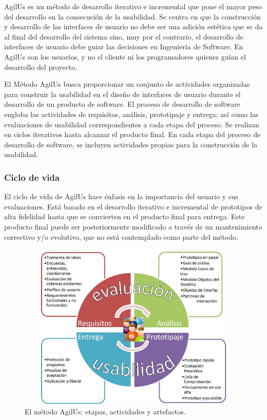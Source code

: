 	AgilUs es un método de desarrollo iterativo e incremental que pone el mayor peso del desarrollo en la consecución de la usabilidad. Se centra en que la construcción y desarrollo de las interfaces de usuario no debe ser una adición estética que se da al final del desarrollo del sistema sino, muy por el contrario, el desarrollo de interfaces de usuario debe guiar las decisiones en Ingeniería de Software. En AgilUs son los usuarios, y no el cliente ni los programadores quienes guían el desarrollo del proyecto.

	El Método AgilUs busca proporcionar un conjunto de actividades organizadas para construir la usabilidad en el diseño de interfaces de usuario durante el desarrollo de un producto de software. El proceso de desarrollo de software engloba las actividades de requisitos, análisis, prototipaje y entrega; así como las evaluaciones de usabilidad correspondientes a cada etapa del proceso. Se realizan en ciclos iterativos hasta alcanzar el producto final. En cada etapa del proceso de desarrollo de software, se incluyen actividades propias para la construcción de la usabilidad.

\setlength{\parskip}{0mm}

\subsubsection{Ciclo de vida}
\setlength{\parskip}{5mm}
	El ciclo de vida de AgilUs hace énfasis en la importancia del usuario y sus evaluaciones. Está basado en el desarrollo iterativo e incremental de prototipos de alta fidelidad hasta que se convierten en el producto final para entrega. Este producto final puede ser posteriormente modificado a través de un mantenimiento correctivo y/o evolutivo, que no está contemplado como parte del método.
	\setlength{\parskip}{0mm}
\newpage
\begin{figure}[H]
\begin{center}
	\includegraphics[width=13cm,height=8cm]{img/agilus.jpg}
\end{center}
\caption{El método AgilUs: etapas, actividades y artefactos.}
\label{fig:Agilus}
\end{figure}



